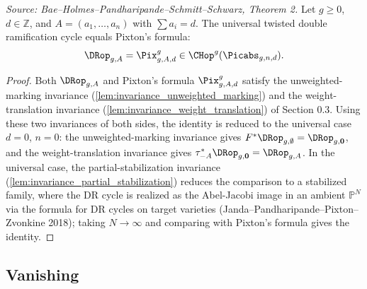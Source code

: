 \begin{theorem}
  \label{thm:main}
  \textit{Source: Bae--Holmes--Pandharipande--Schmitt--Schwarz, Theorem 2.}
  Let $g \geq 0$, $d \in \mathbb{Z}$, and $A = (a_1,\ldots,a_n)$ with $\sum a_i = d$.
  The universal twisted double ramification cycle equals Pixton's formula:
  \[
    \DRop_{g,A} = \Pix^g_{g,A,d} \in \CHop^g(\Picabs_{g,n,d}).
  \]
\end{theorem}

\begin{proof}
  Both $\DRop_{g,A}$ and Pixton's formula $\Pix^g_{g,A,d}$ satisfy the unweighted-marking
  invariance (\cref{lem:invariance_unweighted_marking}) and the weight-translation
  invariance (\cref{lem:invariance_weight_translation}) of Section 0.3.  Using these two
  invariances of both sides, the identity is reduced to the universal case $d = 0$,
  $n = 0$: the unweighted-marking invariance gives
  $F^*\DRop_{g,\emptyset} = \DRop_{g,\mathbf{0}}$, and the weight-translation invariance
  gives $\tau_{-A}^*\DRop_{g,\mathbf{0}} = \DRop_{g,A}$.
  In the universal case, the partial-stabilization invariance
  (\cref{lem:invariance_partial_stabilization}) reduces the comparison to a stabilized
  family, where the DR cycle is realized as the Abel-Jacobi image in an ambient
  $\mathbb{P}^N$ via the formula for DR cycles on target varieties
  (Janda--Pandharipande--Pixton--Zvonkine 2018); taking $N \to \infty$ and comparing
  with Pixton's formula gives the identity.
\end{proof}

\subsection{Vanishing}

